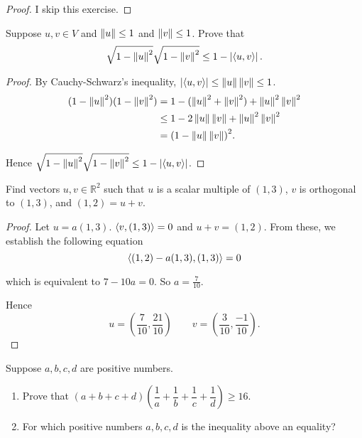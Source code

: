 \begin{proof}
    I skip this exercise.
\end{proof}
\newpage

\begin{exercise}
    Suppose $u, v \in V$ and $\left\Vert{u}\right\Vert\leq 1$ and $\left\Vert{v}\right\Vert\leq 1$. Prove that
    \[
        \sqrt{1 - \left\Vert{u}\right\Vert^{2}}\sqrt{1 - \left\Vert{v}\right\Vert^{2}} \leq 1 - \left\vert{\left\langle{u, v}\right\rangle}\right\vert.
    \]
\end{exercise}

\begin{proof}
    By Cauchy-Schwarz's inequality, $\left\vert{\left\langle{u, v}\right\rangle}\right\vert\leq \left\Vert{u}\right\Vert\left\Vert{v}\right\Vert\leq 1$.
    \begin{align*}
        (1 - \left\Vert{u}\right\Vert^{2})(1 - \left\Vert{v}\right\Vert^{2}) & = 1 - (\left\Vert{u}\right\Vert^{2} + \left\Vert{v}\right\Vert^{2}) + \left\Vert{u}\right\Vert^{2}\left\Vert{v}\right\Vert^{2} \\
                                             & \leq 1 - 2\left\Vert{u}\right\Vert\left\Vert{v}\right\Vert + \left\Vert{u}\right\Vert^{2}\left\Vert{v}\right\Vert^{2}          \\
                                             & = {(1 - \left\Vert{u}\right\Vert\left\Vert{v}\right\Vert)}^{2}.
    \end{align*}

    Hence $\sqrt{1 - \left\Vert{u}\right\Vert^{2}}\sqrt{1 - \left\Vert{v}\right\Vert^{2}} \leq 1 - \left\vert{\left\langle{u, v}\right\rangle}\right\vert$.
\end{proof}
\newpage

\begin{exercise}
    Find vectors $u, v \in \mathbb{R}^{2}$ such that $u$ is a scalar multiple of $(1, 3)$, $v$ is orthogonal to $(1, 3)$, and $(1, 2) = u + v$.
\end{exercise}

\begin{proof}
    Let $u = a(1, 3)$. $\left\langle{v, (1, 3)}\right\rangle = 0$ and $u + v = (1, 2)$. From these, we establish the following equation
    \[
        \left\langle{(1, 2) - a(1, 3), (1, 3)}\right\rangle = 0
    \]

    which is equivalent to $7 - 10a = 0$. So $a = \frac{7}{10}$.

    Hence
    \[
        u = \left(\frac{7}{10}, \frac{21}{10}\right)\qquad v = \left(\frac{3}{10}, \frac{-1}{10}\right).
    \]
\end{proof}
\newpage

\begin{exercise}
    Suppose $a, b, c, d$ are positive numbers.
    \begin{enumerate}[label={(\alph*)}]
        \item Prove that $(a + b + c + d)\left(\dfrac{1}{a} + \dfrac{1}{b} + \dfrac{1}{c} + \dfrac{1}{d}\right)\geq 16$.
        \item For which positive numbers $a, b, c, d$ is the inequality above an equality?
    \end{enumerate}
\end{exercise}

